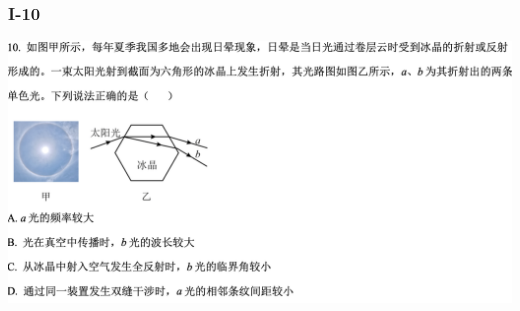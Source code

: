 \documentclass{article}
\begin{document}
        \subsubsection{I-10}
        \includegraphics[width=50em,keepaspectratio]{./pictures/1.3-11.png}
\end{document}
